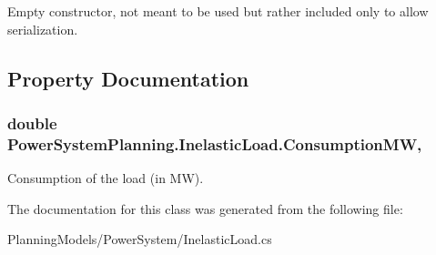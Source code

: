 Empty constructor, not meant to be used but rather included only to allow serialization. 



\subsection{Property Documentation}
\subsubsection[{\texorpdfstring{Consumption\+MW}{ConsumptionMW}}]{\setlength{\rightskip}{0pt plus 5cm}double Power\+System\+Planning.\+Inelastic\+Load.\+Consumption\+MW\hspace{0.3cm}{\ttfamily [get]}, {\ttfamily [set]}}\hypertarget{class_power_system_planning_1_1_inelastic_load_ad37cc0084cc3307039345b7d683bd51d}{}\label{class_power_system_planning_1_1_inelastic_load_ad37cc0084cc3307039345b7d683bd51d}


Consumption of the load (in MW). 



The documentation for this class was generated from the following file\+:\begin{DoxyCompactItemize}
\item 
Planning\+Models/\+Power\+System/Inelastic\+Load.\+cs\end{DoxyCompactItemize}

